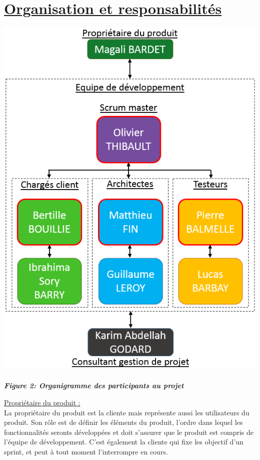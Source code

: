 \documentclass{../res/univ-projet}
\begin{document}
\section{\underline{Organisation et responsabilités}}

\begin{center}
 \includegraphics[scale=0.65]{./graphics/Organigramme_roles} \\~\\
 \textbf{\textit{Figure 2: Organigramme des participants au projet}}
\end{center}

\underline{Propriétaire du produit :} \\

La propriétaire du produit est la cliente mais représente aussi les utilisateurs du produit. Son rôle est de définir les éléments du produit, l'ordre dans lequel 
les fonctionnalités seronts développées et doit s'assurer que le produit est compris de l'équipe de développement. C'est également la cliente qui fixe les objectif 
d'un sprint, et peut à tout moment l'interrompre en cours.
\end{document}

